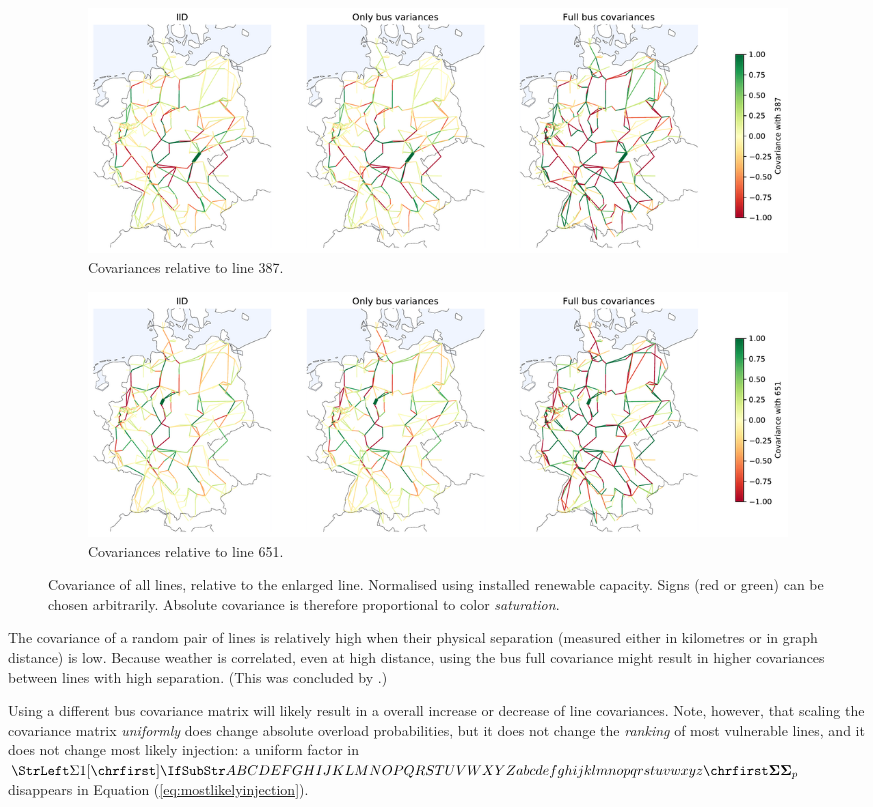 \documentclass[main.tex]{subfiles}
\begin{document}
\begin{figure}[ht]
\begin{subfigure}{\textwidth}
    \centering
    \includegraphics[width=\textwidth]{img/flow_correlation_387_iid_and_justvar_and_fullcov.pdf}
    \caption{Covariances relative to line 387.}\label{fig:linecov1}
\end{subfigure}
\begin{subfigure}{\textwidth}
    \centering
    \includegraphics[width=\textwidth]{img/flow_correlation_651_iid_and_justvar_and_fullcov.pdf}
    \caption{Covariances relative to line 651.}\label{fig:linecov2}
\end{subfigure}
    \caption{Covariance of all lines, relative to the enlarged line. Normalised using installed renewable capacity. Signs (red or green) can be chosen arbitrarily. Absolute covariance is therefore proportional to color \emph{saturation}.}
\end{figure}

The covariance of a random pair of lines is relatively high when their physical separation (measured either in kilometres or in graph distance) is low. Because weather is correlated, even at high distance, using the bus full covariance might result in higher covariances between lines with high separation. (This was concluded by \cite{Nesti2018emergentfailures}.) 

Using a different bus covariance matrix will likely result in a overall increase or decrease of line covariances. Note, however, that scaling the covariance matrix \emph{uniformly} does change absolute overload probabilities, but it does not change the \emph{ranking} of most vulnerable lines, and it does not change most likely injection: a uniform factor in $\mat{\Sigma}_p$ disappears in Equation (\ref{eq:mostlikelyinjection}).
\end{document}

